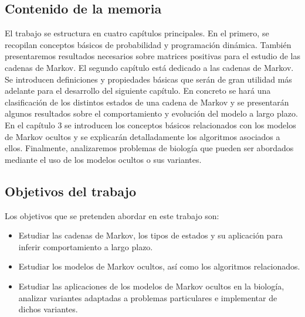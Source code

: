 \subsection*{Contenido de la memoria}
El trabajo se estructura en cuatro capítulos principales. En el primero, se recopilan conceptos básicos de probabilidad y programación dinámica. También presentaremos resultados necesarios sobre matrices positivas para el estudio de las cadenas de Markov. El segundo capítulo está dedicado a las cadenas de Markov. Se introducen definiciones y propiedades básicas que serán de gran utilidad más adelante para el desarrollo del siguiente capítulo. En concreto se hará una clasificación de los distintos estados de una cadena de Markov y se presentarán algunos resultados sobre el comportamiento y evolución del modelo a largo plazo. En el capítulo $3$ se introducen los conceptos básicos relacionados con los modelos de Markov ocultos y se explicarán detalladamente los algoritmos asociados a ellos. Finalmente, analizaremos problemas de biología que pueden ser abordados mediante el uso de los modelos ocultos o sus variantes.


\subsection*{Objetivos del trabajo}
Los objetivos que se pretenden abordar en este trabajo son:
\begin{itemize}
    \item Estudiar las cadenas de Markov, los tipos de estados y su aplicación para inferir comportamiento a largo plazo.
    \item Estudiar los modelos de Markov ocultos, así como los algoritmos relacionados.
    \item Estudiar las aplicaciones de los modelos de Markov ocultos en la biología, analizar variantes adaptadas a problemas particulares e implementar de dichos variantes.
\end{itemize}
